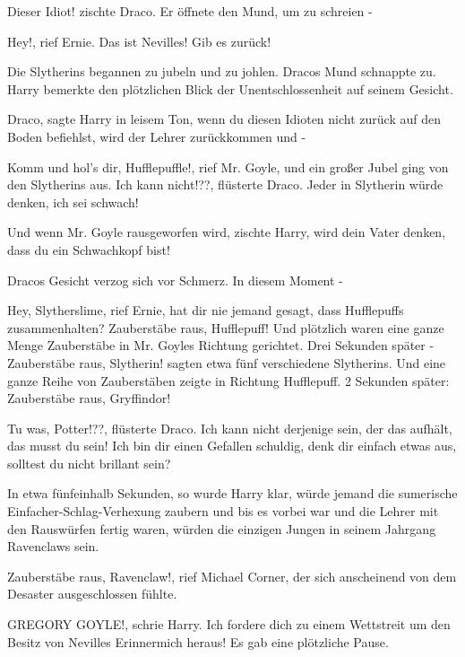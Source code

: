 \glqq Dieser Idiot!\grqq{} zischte Draco. Er öffnete den Mund, um zu schreien -

\glqq Hey!\grqq{}, rief Ernie. \glqq Das ist Nevilles! Gib es zurück!\grqq{}

Die Slytherins begannen zu jubeln und zu johlen. Dracos Mund schnappte zu. Harry
bemerkte den plötzlichen Blick der Unentschlossenheit auf seinem Gesicht.

\glqq Draco\grqq{}, sagte Harry in leisem Ton, \glqq wenn du diesen Idioten
nicht zurück auf den Boden befiehlst, wird der Lehrer zurückkommen und -\grqq{}

\glqq Komm und hol's dir, Hufflepuffle!\grqq{}, rief Mr. Goyle, und ein großer
Jubel ging von den Slytherins aus. \glqq Ich kann nicht!??\grqq{}, flüsterte
Draco. \glqq Jeder in Slytherin würde denken, ich sei schwach!\grqq{}

\glqq Und wenn Mr. Goyle rausgeworfen wird\grqq{}, zischte Harry, \glqq wird
dein Vater denken, dass du ein Schwachkopf bist!\grqq{}

Dracos Gesicht verzog sich vor Schmerz. In diesem Moment -

\glqq Hey, Slytherslime\grqq{}, rief Ernie, \glqq hat dir nie jemand gesagt,
dass Hufflepuffs zusammenhalten? Zauberstäbe raus, Hufflepuff!\grqq{} Und
plötzlich waren eine ganze Menge Zauberstäbe in Mr. Goyles Richtung gerichtet.
Drei Sekunden später - \glqq Zauberstäbe raus, Slytherin!\grqq{} sagten etwa
fünf verschiedene Slytherins. Und eine ganze Reihe von Zauberstäben zeigte in
Richtung Hufflepuff. 2 Sekunden später: \glqq Zauberstäbe raus,
Gryffindor!\grqq{}

\glqq Tu was, Potter!??\grqq{}, flüsterte Draco. \glqq Ich kann nicht derjenige
sein, der das aufhält, das musst du sein! Ich bin dir einen Gefallen schuldig,
denk dir einfach etwas aus, solltest du nicht brillant sein?\grqq{}

In etwa fünfeinhalb Sekunden, so wurde Harry klar, würde jemand die sumerische
Einfacher-Schlag-Verhexung zaubern und bis es vorbei war und die Lehrer mit den
Rauswürfen fertig waren, würden die einzigen Jungen in seinem Jahrgang
Ravenclaws sein.

\glqq Zauberstäbe raus, Ravenclaw!\grqq{}, rief Michael Corner, der sich
anscheinend von dem Desaster ausgeschlossen fühlte.

\glqq GREGORY GOYLE!\grqq{}, schrie Harry. \glqq Ich fordere dich zu einem
Wettstreit um den Besitz von Nevilles Erinnermich heraus!\grqq{} Es gab eine
plötzliche Pause.

